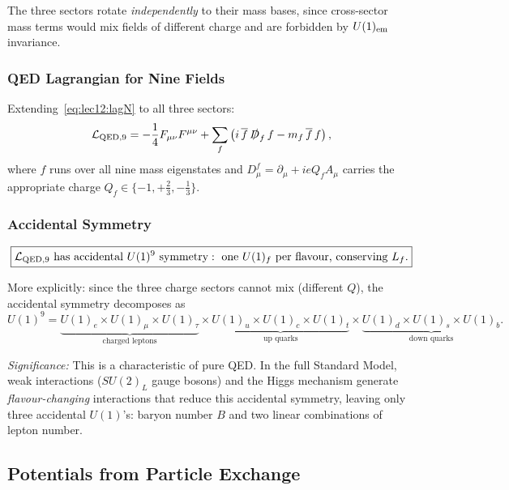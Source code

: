 \documentclass[../main.tex]{subfiles}
\begin{document}
The three sectors rotate \emph{independently} to their mass bases, since cross-sector mass terms would mix fields of different charge and are forbidden by $U(1)_{\rm em}$ invariance.

\subsubsection*{QED Lagrangian for Nine Fields}

Extending~\eqref{eq:lec12:lagN} to all three sectors:
\begin{equation}
  \mathcal{L}_{\rm QED,9}
  =
  -\frac{1}{4}F_{\mu\nu}F^{\mu\nu}
  + \sum_{f}
    \left(i\,\overline{f}\,\slashed{D}_f\,f - m_f\,\overline{f}\,f\right),
  \label{eq:lec12:lag9}
\end{equation}
where $f$ runs over all nine mass eigenstates and $D_\mu^f = \partial_\mu + ie Q_f A_\mu$ carries the appropriate charge $Q_f\in\{-1, +\tfrac{2}{3}, -\tfrac{1}{3}\}$.

\subsubsection*{Accidental Symmetry}

\begin{equation}
  \boxed{
  \mathcal{L}_{\rm QED,9}\text{ has accidental }U(1)^9\text{ symmetry}:
  \text{ one }U(1)_f\text{ per flavour, conserving }L_f.}
  \label{eq:lec12:u9}
\end{equation}

More explicitly: since the three charge sectors cannot mix (different $Q$), the accidental symmetry decomposes as
\begin{equation}
  U(1)^9 = \underbrace{U(1)_e\times U(1)_\mu\times U(1)_\tau}_{\text{charged leptons}}
  \times
  \underbrace{U(1)_u\times U(1)_c\times U(1)_t}_{\text{up quarks}}
  \times
  \underbrace{U(1)_d\times U(1)_s\times U(1)_b}_{\text{down quarks}}.
  \label{eq:lec12:u9decomp}
\end{equation}

\textit{Significance:} This is a characteristic of pure QED.  In the full Standard Model, weak interactions ($SU(2)_L$ gauge bosons) and the Higgs mechanism generate \emph{flavour-changing} interactions that reduce this accidental symmetry, leaving only three accidental $U(1)$'s: baryon number $B$ and two linear combinations of lepton number.

\subsection*{Potentials from Particle Exchange}\label{sec:lec12:potentials}
\end{document}
